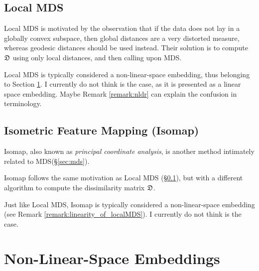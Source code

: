 \subsection{Local MDS}
\label{sec:localMDS}
Local MDS is motivated by the observation that if the data does not lay in a globally convex subspace, then global distances are a very distorted measure, whereas geodesic distances should be used instead. 
Their solution is to compute $\mathfrak{D}$ using only local distances, and then calling upon MDS.

\begin{remark}
\label{remark:linearity_of_localMDS}
Local MDS is typically considered a non-linear-space embedding, thus belonging to Section \ref{sec:dim_reduce_nonlinear}.
I currently do not think is the case, as it is presented as a linear space embedding.
Maybe Remark \ref{remark:nldr} can explain the confusion in terminology.
\end{remark}



\subsection{Isometric Feature Mapping (Isomap)}
\label{sec:isomap}

Isomap, also known as \emph{principal coordinate analysis}, is another method intimately related to MDS(\S\ref{sec:mds}).

Isomap follows the same motivation as Local MDS (\S\ref{sec:localMDS}), but with a different algorithm to compute the dissimilarity matrix $\mathfrak{D}$.

\begin{remark}
Just like Local MDS, Isomap is typically considered a non-linear-space embedding (see Remark \ref{remark:linearity_of_localMDS}).
I currently do not think is the case.
\end{remark}









\section{Non-Linear-Space Embeddings}
\label{sec:dim_reduce_nonlinear}



